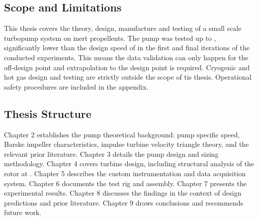 \subsection{Scope and Limitations}

This thesis covers the theory, design, manufacture and testing of a small scale turbopump system on inert propellents. The pump was tested up to \valPumpRpmMaxreached, significantly lower than the design speed of \valPumpRpmDesign in the first and final iterations of the conducted experiments. This means the data validation can only happen for the off-design point and extrapolation to the design point is required. Cryogenic and hot gas design and testing are strictly outside the scope of tis thesis. Operational safety procedures are included in the appendix.

\subsection{Thesis Structure}

Chapter 2 establishes the pump theoretical background: pump specific speed, Barske impeller characteristics, impulse turbine velocity triangle theory, and the relevant prior literature. Chapter 3 details the pump design and sizing methodology. Chapter 4 covers turbine design, including structural analysis of the rotor at \valPumpRpmDesign. Chapter 5 describes the custom instrumentation and data acquisition system. Chapter 6 documents the test rig and assembly. Chapter 7 presents the experimental results. Chapter 8 discusses the findings in the context of design predictions and prior literature. Chapter 9 draws conclusions and recommends future work.